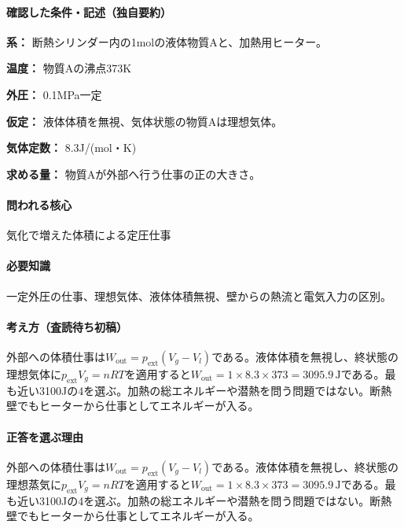 \paragraph{確認した条件・記述（独自要約）}\mbox{}\par

\noindent\textbf{系：} 断熱シリンダー内の1molの液体物質Aと、加熱用ヒーター。\par

\noindent\textbf{温度：} 物質Aの沸点373K\par

\noindent\textbf{外圧：} 0.1MPa一定\par

\noindent\textbf{仮定：} 液体体積を無視、気体状態の物質Aは理想気体。\par

\noindent\textbf{気体定数：} 8.3J/(mol・K)\par

\noindent\textbf{求める量：} 物質Aが外部へ行う仕事の正の大きさ。\par

\paragraph{問われる核心} 気化で増えた体積による定圧仕事

\paragraph{必要知識} 一定外圧の仕事、理想気体、液体体積無視、壁からの熱流と電気入力の区別。

\paragraph{考え方（査読待ち初稿）} 外部への体積仕事は\(W_{\mathrm{out}}=p_{\mathrm{ext}}(V_g-V_l)\)である。液体体積を無視し、終状態の理想気体に\(p_{\mathrm{ext}}V_g=nRT\)を適用すると\(W_{\mathrm{out}}=1\times8.3\times373=3095.9\,\mathrm{J}\)である。最も近い3100Jの4を選ぶ。加熱の総エネルギーや潜熱を問う問題ではない。断熱壁でもヒーターから仕事としてエネルギーが入る。

\paragraph{正答を選ぶ理由} 外部への体積仕事は\(W_{\mathrm{out}}=p_{\mathrm{ext}}(V_g-V_l)\)である。液体体積を無視し、終状態の理想蒸気に\(p_{\mathrm{ext}}V_g=nRT\)を適用すると\(W_{\mathrm{out}}=1\times8.3\times373=3095.9\,\mathrm{J}\)である。最も近い3100Jの4を選ぶ。加熱の総エネルギーや潜熱を問う問題ではない。断熱壁でもヒーターから仕事としてエネルギーが入る。

